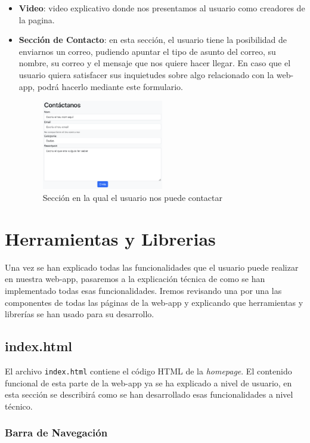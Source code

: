 \documentclass{article}
\begin{document}
\begin{itemize}
    \item \textbf{Video}: video explicativo donde nos presentamos al usuario como creadores de la pagina.
    \item \textbf{Sección de Contacto}: en esta sección, el usuario tiene la posibilidad de enviarnos un correo, pudiendo apuntar el tipo de asunto del correo, su nombre, su correo y el mensaje que nos quiere hacer llegar. En caso que el usuario quiera satisfacer sus inquietudes sobre algo relacionado con la web-app, podrá hacerlo mediante este formulario.
    \begin{figure}[ht]
        \centering
        \includegraphics[width=0.5\textwidth]{images/contacto.png}
        \caption{Sección en la qual el usuario nos puede contactar}
    \end{figure}
\end{itemize}
\newpage
\section{Herramientas y Librerias}
Una vez se han explicado todas las funcionalidades que el usuario puede realizar en nuestra web-app, pasaremos a la explicación técnica de como se han implementado todas esas funcionalidades. Iremos revisando una por una las componentes de todas las páginas de la web-app y explicando que herramientas y librerías se han usado para su desarrollo.
\subsection{index.html}
El archivo \texttt{index.html} contiene el código HTML de la \textit{homepage}. El contenido funcional de esta parte de la web-app ya se ha explicado a nivel de usuario, en esta sección se describirá como se han desarrollado esas funcionalidades a nivel técnico.

\subsubsection{Barra de Navegación}
\end{document}
